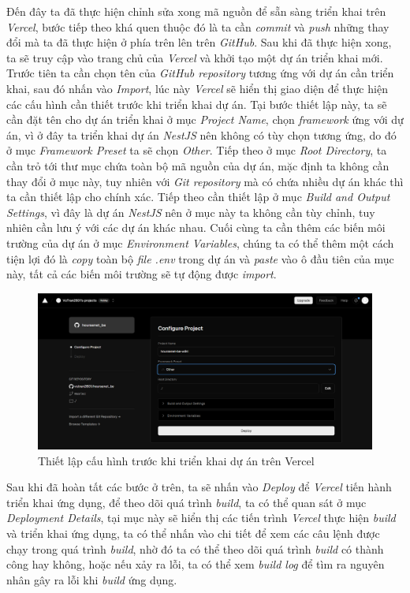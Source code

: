 \hspace*{1cm}
Đến đây ta đã thực hiện chỉnh sửa xong mã nguồn để sẵn sàng triển khai trên \textit{Vercel}, bước tiếp theo khá quen thuộc đó là ta cần \textit{commit} và \textit{push} những thay đổi mà ta đã thực hiện ở phía trên lên trên \textit{GitHub}. Sau khi đã thực hiện xong, ta sẽ truy cập vào trang chủ của \textit{Vercel} và khởi tạo một dự án triển khai mới. Trước tiên ta cần chọn tên của \textit{GitHub repository} tương ứng với dự án cần triển khai, sau đó nhấn vào \textit{Import}, lúc này \textit{Vercel} sẽ hiển thị giao diện để thực hiện các cấu hình cần thiết trước khi triển khai dự án. Tại bước thiết lập này, ta sẽ cần đặt tên cho dự án triển khai ở mục \textit{Project Name}, chọn \textit{framework} ứng với dự án, vì ở đây ta triển khai dự án \textit{NestJS} nên không có tùy chọn tương ứng, do đó ở mục \textit{Framework Preset} ta sẽ chọn \textit{Other}. Tiếp theo ở mục \textit{Root Directory}, ta cần trỏ tới thư mục chứa toàn bộ mã nguồn của dự án, mặc định ta không cần thay đổi ở mục này, tuy nhiên với \textit{Git repository} mà có chứa nhiều dự án khác thì ta cần thiết lập cho chính xác. Tiếp theo cần thiết lập ở mục \textit{Build and Output Settings}, vì đây là dự án \textit{NestJS} nên ở mục này ta không cần tùy chỉnh, tuy nhiên cần lưu ý với các dự án khác nhau. Cuối cùng ta cần thêm các biến môi trường của dự án ở mục \textit{Environment Variables}, chúng ta có thể thêm một cách tiện lợi đó là \textit{copy} toàn bộ \textit{file .env} trong dự án và \textit{paste} vào ô đầu tiên của mục này, tất cả các biến môi trường sẽ tự động được \textit{import}.
\begin{figure}[H]
    \centering
    \includegraphics[width=1\textwidth]{Images/Deployment/Backend/VercelConfig.png}
    \caption{Thiết lập cấu hình trước khi triển khai dự án trên Vercel}
\end{figure}
\hspace*{1cm}
Sau khi đã hoàn tất các bước ở trên, ta sẽ nhấn vào \textit{Deploy} để \textit{Vercel} tiến hành triển khai ứng dụng, để theo dõi quá trình \textit{build}, ta có thể quan sát ở mục \textit{Deployment Details}, tại mục này sẽ hiển thị các tiến trình \textit{Vercel} thực hiện \textit{build} và triển khai ứng dụng, ta có thể nhấn vào chi tiết để xem các câu lệnh được chạy trong quá trình \textit{build}, nhờ đó ta có thể theo dõi quá trình \textit{build} có thành công hay không, hoặc nếu xảy ra lỗi, ta có thể xem \textit{build log} để tìm ra nguyên nhân gây ra lỗi khi \textit{build} ứng dụng.
